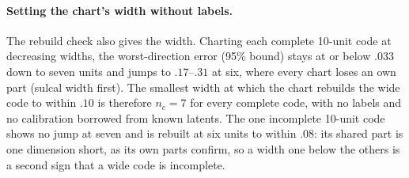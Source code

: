 \paragraph{Setting the chart's width without labels.} The rebuild check also
gives the width. Charting each complete 10-unit code at decreasing widths, the
worst-direction error (95\% bound) stays at or below $.033$ down to seven units
and jumps to $.17$--$.31$ at six, where every chart loses an own part (sulcal
width first). The smallest width at which the chart rebuilds the wide code to
within $.10$ is therefore $n_c = 7$ for every complete code, with no labels and
no calibration borrowed from known latents. The one incomplete 10-unit code
shows no jump at seven and is rebuilt at six units to within $.08$: its shared
part is one dimension short, as its own parts confirm, so a width one below the
others is a second sign that a wide code is incomplete.

